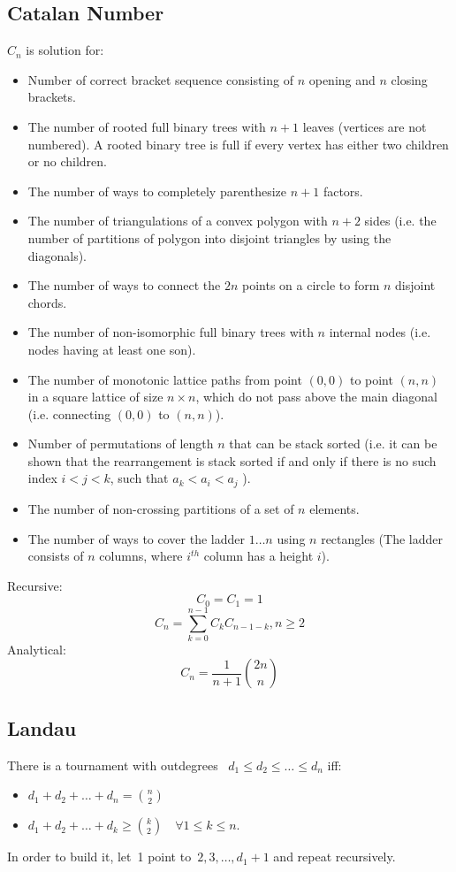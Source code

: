 \subsection{Catalan Number}
$C_n$ is solution for:
\begin{itemize}
	\item Number of correct bracket sequence consisting of $n$ opening and $n$ closing brackets.
	\item The number of rooted full binary trees with $n+1$ leaves (vertices are not numbered). A rooted binary tree is full if every vertex has either two children or no children.
	\item The number of ways to completely parenthesize $n+1$ factors.
	\item The number of triangulations of a convex polygon with $n+2$ sides (i.e. the number of partitions of polygon into disjoint triangles by using the diagonals).
	\item The number of ways to connect the $2n$ points on a circle to form $n$ disjoint chords.
	\item The number of non-isomorphic full binary trees with $n$ internal nodes (i.e. nodes having at least one son).
	\item The number of monotonic lattice paths from point $(0,0)$ to point $(n,n)$ in a square lattice of size $n\times{}n$, which do not pass above the main diagonal (i.e. connecting $(0,0)$ to $(n,n)$).
	\item Number of permutations of length $n$ that can be stack sorted (i.e. it can be shown that the rearrangement is stack sorted if and only if there is no such index $i<j<k$, such that $a_k<a_i<a_j$ ).
	\item The number of non-crossing partitions of a set of $n$ elements.
	\item The number of ways to cover the ladder $1\dots n$ using $n$ rectangles (The ladder consists of $n$ columns, where $i^{th}$ column has a height $i$).
\end{itemize}
Recursive: \[C_0=C_1=1\] \[C_n= \sum_{k=0}^{n-1}C_kC_{n-1-k}, n\geq2\]
Analytical: \[C_n=\frac{1}{n+1}{2n \choose n}\]

\subsection{Landau}
There is a tournament with outdegrees ~$d_1 \leq d_2 \leq \ldots \leq d_n$ iff:
\begin{itemize}
\item $d_1 + d_2 + \ldots + d_n = {n \choose 2}$
\item $d_1 + d_2 + \ldots + d_k \geq {k \choose 2} \quad \forall 1 \leq k \leq n.$
\end{itemize}
In order to build it, let~1 point to~$2, 3, \ldots, d_1 + 1$ and repeat recursively.

